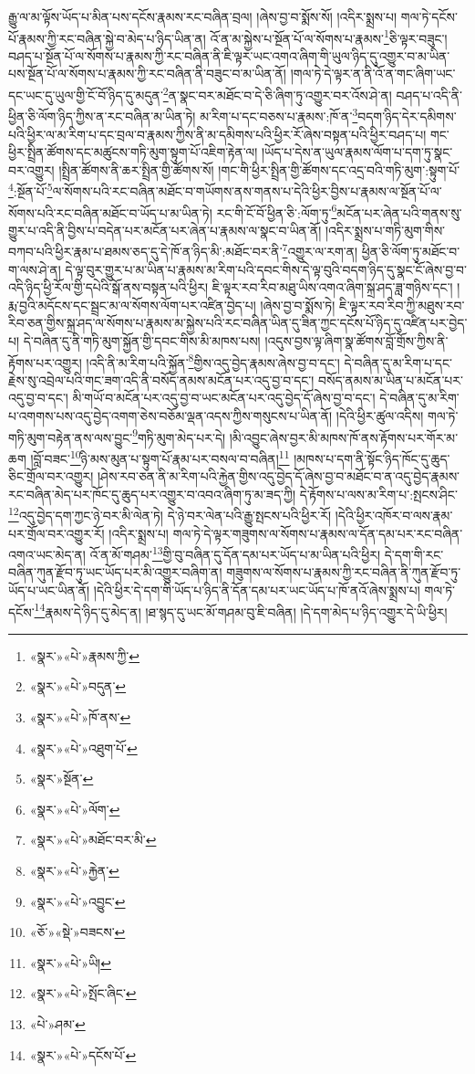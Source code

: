 རྒྱུ་ལ་མ་ལྟོས་ཡོད་པ་མིན་པས་དངོས་རྣམས་རང་བཞིན་བྲལ། །ཞེས་བྱ་བ་སྨོས་སོ། །འདིར་སྨྲས་པ། གལ་ཏེ་དངོས་པོ་རྣམས་ཀྱི་རང་བཞིན་སྐྱེ་བ་མེད་པ་ཉིད་ཡིན་ན། འོ་ན་མ་སྐྱེས་པ་སྔོན་པོ་ལ་སོགས་པ་རྣམས་\footnote{«སྣར་»«པེ་»རྣམས་ཀྱི་}ཅི་ལྟར་བཟུང་། བཤད་པ་སྔོན་པོ་ལ་སོགས་པ་རྣམས་ཀྱི་རང་བཞིན་ནི་ཇི་ལྟར་ཡང་འགའ་ཞིག་གི་ཡུལ་ཉིད་དུ་འགྱུར་བ་མ་ཡིན་པས་སྔོན་པོ་ལ་སོགས་པ་རྣམས་ཀྱི་རང་བཞིན་ནི་བཟུང་བ་མ་ཡིན་ནོ། །གལ་ཏེ་དེ་ལྟར་ན་ནི་འོ་ན་གང་ཞིག་ཡང་དང་ཡང་དུ་ཡུལ་གྱི་ངོ་བོ་ཉིད་དུ་མདུན་\footnote{«སྣར་»«པེ་»བདུན་}ན་སྣང་བར་མཐོང་བ་དེ་ཅི་ཞིག་ཏུ་འགྱུར་བར་འོས་ཤེ་ན། བཤད་པ་འདི་ནི་ཕྱིན་ཅི་ལོག་ཉིད་ཀྱིས་ན་རང་བཞིན་མ་ཡིན་ཏེ། མ་རིག་པ་དང་བཅས་པ་རྣམས་:ཁོ་ན་\footnote{«སྣར་»«པེ་»ཁོ་ནས་}བདག་ཉིད་དེར་དམིགས་པའི་ཕྱིར་ལ་མ་རིག་པ་དང་བྲལ་བ་རྣམས་ཀྱིས་ནི་མ་དམིགས་པའི་ཕྱིར་རོ་ཞེས་བསྟན་པའི་ཕྱིར་བཤད་པ། གང་ཕྱིར་སྤྲིན་ཚོགས་དང་མཚུངས་གཏི་མུག་སྟུག་པོ་འཇིག་རྟེན་ལ། །ཡོད་པ་དེས་ན་ཡུལ་རྣམས་ལོག་པ་དག་ཏུ་སྣང་བར་འགྱུར། །སྤྲིན་ཚོགས་ནི་ཆར་སྤྲིན་གྱི་ཚོགས་སོ། །གང་གི་ཕྱིར་སྤྲིན་གྱི་ཚོགས་དང་འདྲ་བའི་གཏི་མུག་:སྟུག་པོ་\footnote{«སྣར་»«པེ་»འཐུག་པོ་}:སྔོན་པོ་\footnote{«སྣར་»སྔོན་}ལ་སོགས་པའི་རང་བཞིན་མཐོང་བ་གཡོགས་ནས་གནས་པ་དེའི་ཕྱིར་བྱིས་པ་རྣམས་ལ་སྔོན་པོ་ལ་སོགས་པའི་རང་བཞིན་མཐོང་བ་ཡོད་པ་མ་ཡིན་ཏེ། རང་གི་ངོ་བོ་ཕྱིན་ཅི་:ལོག་ཏུ་\footnote{«སྣར་»«པེ་»ལོག་}མངོན་པར་ཞེན་པའི་གནས་སུ་གྱུར་པ་འདི་ནི་བྱིས་པ་བདེན་པར་མངོན་པར་ཞེན་པ་རྣམས་ལ་སྣང་བ་ཡིན་ནོ། །འདིར་སྨྲས་པ་གཏི་མུག་གིས་བཀབ་པའི་ཕྱིར་རྣམ་པ་ཐམས་ཅད་དུ་དེ་ཁོ་ན་ཉིད་མི་:མཐོང་བར་ནི་\footnote{«སྣར་»«པེ་»མཐོང་བར་མི་}འགྱུར་ལ་རག་ན། ཕྱིན་ཅི་ལོག་ཏུ་མཐོང་བ་ག་ལས་ཤེ་ན། དེ་ལྟ་བུར་གྱུར་པ་མ་ཡིན་པ་རྣམས་མ་རིག་པའི་དབང་གིས་དེ་ལྟ་བུའི་བདག་ཉིད་དུ་སྣང་ངོ་ཞེས་བྱ་བ་འདི་ཉིད་ཕྱི་རོལ་གྱི་དཔེའི་སྒོ་ནས་བསྟན་པའི་ཕྱིར། ཇི་ལྟར་རབ་རིབ་མཐུ་ཡིས་འགའ་ཞིག་སྐྲ་ཤད་ཟླ་གཉིས་དང་། །རྨ་བྱའི་མདོངས་དང་སྦྲང་མ་ལ་སོགས་ལོག་པར་འཛིན་བྱེད་པ། །ཞེས་བྱ་བ་སྨོས་ཏེ། ཇི་ལྟར་རབ་རིབ་ཀྱི་མཐུས་རབ་རིབ་ཅན་གྱིས་སྐྲ་ཤད་ལ་སོགས་པ་རྣམས་མ་སྐྱེས་པའི་རང་བཞིན་ཡིན་དུ་ཟིན་ཀྱང་དངོས་པོ་ཉིད་དུ་འཛིན་པར་བྱེད་པ། དེ་བཞིན་དུ་ནི་གཏི་མུག་སྐྱོན་གྱི་དབང་གིས་མི་མཁས་པས། །འདུས་བྱས་ལྟ་ཞིག་སྣ་ཚོགས་བློ་གྲོས་ཀྱིས་ནི་རྟོགས་པར་འགྱུར། །འདི་ནི་མ་རིག་པའི་སྐྱོན་\footnote{«སྣར་»«པེ་»རྐྱེན་}གྱིས་འདུ་བྱེད་རྣམས་ཞེས་བྱ་བ་དང་། དེ་བཞིན་དུ་མ་རིག་པ་དང་རྗེས་སུ་འབྲེལ་པའི་གང་ཟག་འདི་ནི་བསོད་ནམས་མངོན་པར་འདུ་བྱ་བ་དང་། བསོད་ནམས་མ་ཡིན་པ་མངོན་པར་འདུ་བྱ་བ་དང་། མི་གཡོ་བ་མངོན་པར་འདུ་བྱ་བ་ཡང་མངོན་པར་འདུ་བྱེད་དོ་ཞེས་བྱ་བ་དང་། དེ་བཞིན་དུ་མ་རིག་པ་འགགས་པས་འདུ་བྱེད་འགག་ཅེས་བཅོམ་ལྡན་འདས་ཀྱིས་གསུངས་པ་ཡིན་ནོ། །དེའི་ཕྱིར་ཚུལ་འདིས། གལ་ཏེ་གཏི་མུག་བརྟེན་ནས་ལས་བྱུང་\footnote{«སྣར་»«པེ་»འབྱུང་}གཏི་མུག་མེད་པར་དེ། །མི་འབྱུང་ཞེས་བྱར་མི་མཁས་ཁོ་ནས་རྟོགས་པར་གོར་མ་ཆག །བློ་བཟང་\footnote{«ཅོ་»«སྡེ་»བཟངས་}ཉི་མས་མུན་པ་སྟུག་པོ་རྣམ་པར་བསལ་བ་བཞིན།\footnote{«སྣར་»«པེ་»ཡི།} །མཁས་པ་དག་ནི་སྟོང་ཉིད་ཁོང་དུ་ཆུད་ཅིང་གྲོལ་བར་འགྱུར། །ཤེས་རབ་ཅན་ནི་མ་རིག་པའི་རྐྱེན་གྱིས་འདུ་བྱེད་དོ་ཞེས་བྱ་བ་མཐོང་བ་ན་འདུ་བྱེད་རྣམས་རང་བཞིན་མེད་པར་ཁོང་དུ་ཆུད་པར་འགྱུར་བ་འབའ་ཞིག་ཏུ་མ་ཟད་ཀྱི། དེ་རྟོགས་པ་ལས་མ་རིག་པ་:སྤངས་ཤིང་\footnote{«སྣར་»«པེ་»སྤོང་ཞིང་}འདུ་བྱེད་དག་ཀྱང་ཉེ་བར་མི་ལེན་ཏེ། དེ་ཉེ་བར་ལེན་པའི་རྒྱུ་སྤངས་པའི་ཕྱིར་རོ། །དེའི་ཕྱིར་འཁོར་བ་ལས་རྣམ་པར་གྲོལ་བར་འགྱུར་རོ། །འདིར་སྨྲས་པ། གལ་ཏེ་དེ་ལྟར་གཟུགས་ལ་སོགས་པ་རྣམས་ལ་དོན་དམ་པར་རང་བཞིན་འགའ་ཡང་མེད་ན། འོ་ན་མོ་གཤམ་\footnote{«པེ་»ཤམ་}གྱི་བུ་བཞིན་དུ་དོན་དམ་པར་ཡོད་པ་མ་ཡིན་པའི་ཕྱིར། དེ་དག་གི་རང་བཞིན་ཀུན་རྫོབ་ཏུ་ཡང་ཡོད་པར་མི་འགྱུར་བཞིག་ན། གཟུགས་ལ་སོགས་པ་རྣམས་ཀྱི་རང་བཞིན་ནི་ཀུན་རྫོབ་ཏུ་ཡོད་པ་ཡང་ཡིན་ནོ། །དེའི་ཕྱིར་དེ་དག་གི་ཡོད་པ་ཉིད་ནི་དོན་དམ་པར་ཡང་ཡོད་པ་ཁོ་ནའོ་ཞེས་སྨྲས་པ། གལ་ཏེ་དངོས་\footnote{«སྣར་»«པེ་»དངོས་པོ་}རྣམས་དེ་ཉིད་དུ་མེད་ན། །ཐ་སྙད་དུ་ཡང་མོ་གཤམ་བུ་ཇི་བཞིན། །དེ་དག་མེད་པ་ཉིད་འགྱུར་དེ་ཡི་ཕྱིར། 
